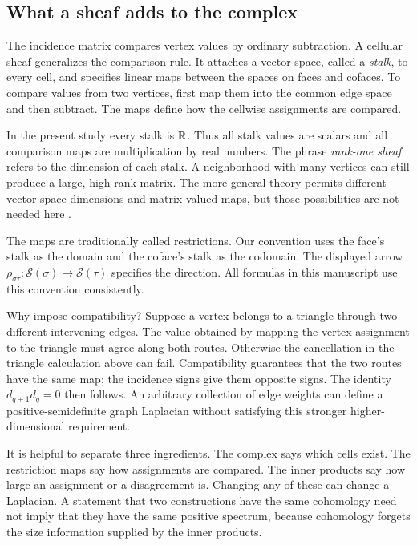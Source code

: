 \subsection{What a sheaf adds to the complex}
The incidence matrix compares vertex values by ordinary subtraction. A cellular sheaf generalizes the comparison rule. It attaches a vector space, called a \emph{stalk}, to every cell, and specifies linear maps between the spaces on faces and cofaces. To compare values from two vertices, first map them into the common edge space and then subtract. The maps define how the cellwise assignments are compared.

In the present study every stalk is $\mathbb{R}$. Thus all stalk values are scalars and all comparison maps are multiplication by real numbers. The phrase \emph{rank-one sheaf} refers to the dimension of each stalk. A neighborhood with many vertices can still produce a large, high-rank matrix. The more general theory permits different vector-space dimensions and matrix-valued maps, but those possibilities are not needed here \citep{hansen2019}.

The maps are traditionally called restrictions. Our convention uses the face's stalk as the domain and the coface's stalk as the codomain. The displayed arrow $\rho_{\sigma\tau}:\mathcal S(\sigma)\to\mathcal S(\tau)$ specifies the direction. All formulas in this manuscript use this convention consistently.

Why impose compatibility? Suppose a vertex belongs to a triangle through two different intervening edges. The value obtained by mapping the vertex assignment to the triangle must agree along both routes. Otherwise the cancellation in the triangle calculation above can fail. Compatibility guarantees that the two routes have the same map; the incidence signs give them opposite signs. The identity $d_{q+1}d_q=0$ then follows. An arbitrary collection of edge weights can define a positive-semidefinite graph Laplacian without satisfying this stronger higher-dimensional requirement.

It is helpful to separate three ingredients. The complex says which cells exist. The restriction maps say how assignments are compared. The inner products say how large an assignment or a disagreement is. Changing any of these can change a Laplacian. A statement that two constructions have the same cohomology need not imply that they have the same positive spectrum, because cohomology forgets the size information supplied by the inner products.

